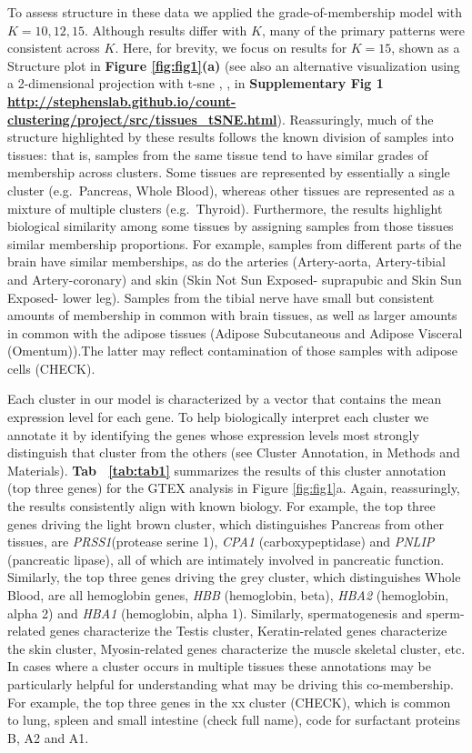 To assess structure in these data we applied the grade-of-membership model with $K=10,12,15$. Although results differ with $K$, many of the primary patterns were consistent across $K$. Here, for brevity, we focus on results for $K=15$, shown as a Structure plot in \textbf{Figure \ref{fig:fig1}(a)} (see also an alternative visualization using a 2-dimensional projection with t-sne \cite{Maaten2008}, \cite{Maaten2014}, in \textbf{Supplementary Fig 1 \url{http://stephenslab.github.io/count-clustering/project/src/tissues_tSNE.html}}). Reassuringly, much of the structure highlighted by these results follows the known division of samples into tissues: that is, samples from the same tissue tend to have similar grades of membership across clusters. Some tissues are represented by essentially a single cluster (e.g.~Pancreas, Whole Blood), whereas other tissues are represented as a mixture of multiple clusters (e.g.~Thyroid). Furthermore, the results highlight biological similarity among some tissues by assigning samples from those tissues similar membership proportions. For example, samples from different parts of the brain have similar memberships, as do the arteries (Artery-aorta, Artery-tibial and Artery-coronary) and skin (Skin Not Sun Exposed- suprapubic and Skin Sun Exposed- lower leg). Samples from the tibial nerve have small but consistent amounts of membership in common with brain tissues, as well as larger amounts in common with the adipose tissues (Adipose Subcutaneous and Adipose Visceral (Omentum)).The latter may reflect contamination of those samples with adipose cells (CHECK).
 
Each cluster in our model is characterized by a vector that contains the mean expression level for each gene. To help biologically interpret each cluster we annotate it by identifying the genes whose expression levels most strongly distinguish that cluster from the others (see Cluster Annotation, in Methods and Materials).  \textbf{Tab ~\ref{tab:tab1}} summarizes the results of this cluster annotation (top three genes) for the GTEX analysis in Figure \ref{fig:fig1}a.  Again, reassuringly, the results consistently align with known biology. For example, 
the top three genes driving the light brown cluster, which distinguishes Pancreas from other tissues, are 
 \textit{PRSS1}(protease serine 1), \textit{CPA1} (carboxypeptidase) and \textit{PNLIP} (pancreatic lipase), all of which are
intimately involved in pancreatic function. Similarly, the top three genes driving the grey cluster, which distinguishes Whole Blood, are all hemoglobin genes, \textit{HBB} (hemoglobin, beta), \textit{HBA2} (hemoglobin, alpha 2) and \textit{HBA1} (hemoglobin, alpha 1). 
Similarly, spermatogenesis and sperm-related genes characterize the Testis cluster, Keratin-related genes characterize the skin cluster, Myosin-related genes characterize the muscle skeletal cluster, etc. In cases where a cluster occurs in multiple tissues these
annotations may be particularly helpful for understanding what may be driving this co-membership. For example, the top three genes in the  xx cluster (CHECK), which is common to lung, spleen and small intestine (check full name), code for surfactant proteins B, A2 and A1.


